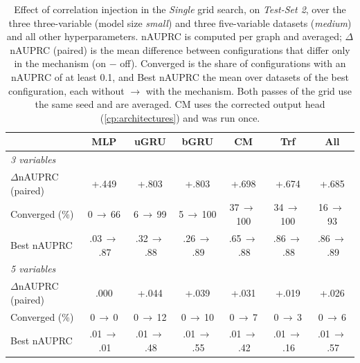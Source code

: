 \begin{table}[ht]
    \centering
    \small
    \setlength{\tabcolsep}{3pt}
    \begin{tabular}{lccccc|c}
    \toprule
        ~ & \textbf{MLP} & \textbf{uGRU} & \textbf{bGRU} & \textbf{CM} & \textbf{Trf} & \textbf{All} \\
    \midrule
        \textit{3 variables} & \multicolumn{6}{c}{} \\
        \quad $\Delta$nAUPRC (paired) & +.449 & +.803 & +.803 & +.698 & +.674 & +.685 \\
        \quad Converged (\%) & 0\,$\to$\,66 & 6\,$\to$\,99 & 5\,$\to$\,100 & 37\,$\to$\,100 & 34\,$\to$\,100 & 16\,$\to$\,93 \\
        \quad Best nAUPRC & .03\,$\to$\,.87 & .32\,$\to$\,.88 & .26\,$\to$\,.89 & .65\,$\to$\,.88 & .86\,$\to$\,.88 & .86\,$\to$\,.89 \\
        \textit{5 variables} & \multicolumn{6}{c}{} \\
        \quad $\Delta$nAUPRC (paired) & .000 & +.044 & +.039 & +.031 & +.019 & +.026 \\
        \quad Converged (\%) & 0\,$\to$\,0 & 0\,$\to$\,12 & 0\,$\to$\,10 & 0\,$\to$\,7 & 0\,$\to$\,3 & 0\,$\to$\,6 \\
        \quad Best nAUPRC & .01\,$\to$\,.01 & .01\,$\to$\,.48 & .01\,$\to$\,.55 & .01\,$\to$\,.42 & .01\,$\to$\,.16 & .01\,$\to$\,.57 \\
    \bottomrule
    \end{tabular}
    \caption{Effect of correlation injection in the \emph{Single} grid search, on \textit{Test-Set 2}, over the three three-variable (model size \emph{small}) and three five-variable datasets (\emph{medium}) and all other hyperparameters. nAUPRC is computed per graph and averaged; $\Delta$nAUPRC (paired) is the mean difference between configurations that differ only in the mechanism (on $-$ off). Converged is the share of configurations with an nAUPRC of at least 0.1, and Best nAUPRC the mean over datasets of the best configuration, each without $\to$ with the mechanism. Both passes of the grid use the same seed and are averaged. CM uses the corrected output head (\cref{cp:architectures}) and was run once.}
    \label{tab:cp:ci:ts2}
\end{table}
